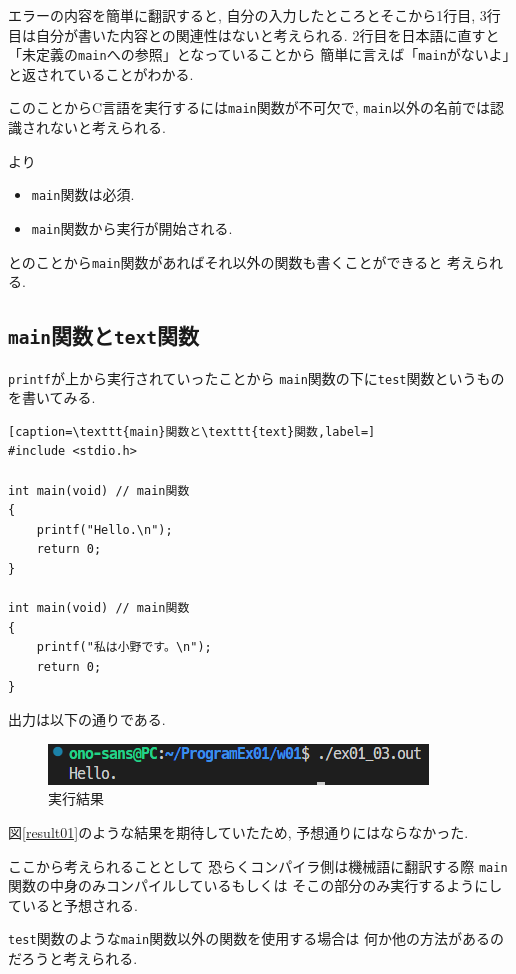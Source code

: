 \documentclass[a4paper, xelatex, ja=standard, 10.5pt]{bxjsarticle}
\begin{document}
エラーの内容を簡単に翻訳すると,
自分の入力したところとそこから1行目, 
3行目は自分が書いた内容との関連性はないと考えられる.
2行目を日本語に直すと「未定義の\texttt{main}への参照」となっていることから
簡単に言えば「\texttt{main}がないよ」と返されていることがわかる.

このことからC言語を実行するには\texttt{main}関数が不可欠で,
\texttt{main}以外の名前では認識されないと考えられる.

\cite{key1}より

\begin{itemize}
  \item \texttt{main}関数は必須.
  \item \texttt{main}関数から実行が開始される.
\end{itemize}

とのことから\texttt{main}関数があればそれ以外の関数も書くことができると
考えられる.
\clearpage
\subsection{\texttt{main}関数と\texttt{text}関数}
\texttt{printf}が上から実行されていったことから
\texttt{main}関数の下に\texttt{test}関数というものを書いてみる.

\begin{lstlisting}[caption=\texttt{main}関数と\texttt{text}関数,label=]
#include <stdio.h>

int main(void) // main関数
{
    printf("Hello.\n");
    return 0;
}

int main(void) // main関数
{
    printf("私は小野です。\n");
    return 0;
}
\end{lstlisting}

出力は以下の通りである.

\begin{figure}[H]
  \centering
  \includegraphics[scale=0.7]{img/main_test.png}
  \caption{実行結果}
  \label{result03}
  \end{figure}

図\ref{result01}のような結果を期待していたため,
予想通りにはならなかった.

ここから考えられることとして
恐らくコンパイラ側は機械語に翻訳する際
\texttt{main}関数の中身のみコンパイルしているもしくは
そこの部分のみ実行するようにしていると予想される.

\texttt{test}関数のような\texttt{main}関数以外の関数を使用する場合は
何か他の方法があるのだろうと考えられる.
\end{document}
